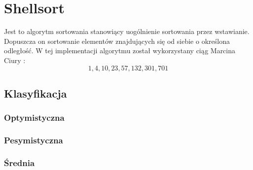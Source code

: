 

\section{Shellsort}
Jest to algorytm sortowania stanowiący uogólnienie sortowania przez wstawianie. Dopuszcza on sortowanie elementów znajdujących się od siebie o określona odległość. W tej implementacji algorytmu został wykorzystany ciąg Marcina Ciury :
\begin{equation*}
 	1 , 4 , 10 , 23 , 57 , 132 , 301 , 701 
\end{equation*}
\subsection{Klasyfikacja}
\subsubsection{Optymistyczna}

\subsubsection{Pesymistyczna}

\subsubsection{Średnia}


